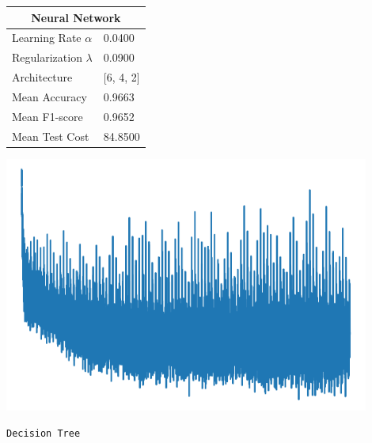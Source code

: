 \documentclass{article}
\begin{document}
\begin{minipage}{0.49\textwidth}
    \centering

    \begin{tabular}{ll}
        \toprule
        \multicolumn{2}{c}{Neural Network} \\
        \midrule
        Learning Rate $\alpha$ & 0.0400 \\
        Regularization $\lambda$ & 0.0900 \\
        Architecture & [6, 4, 2] \\
        Mean Accuracy & 0.9663 \\
        Mean F1-score & 0.9652 \\
        Mean Test Cost & 84.8500 \\
        \bottomrule
    \end{tabular}
    
\end{minipage}
\hfill
\begin{minipage}{0.49\textwidth}
    \centering
    \includegraphics*[width=0.9\textwidth]{./src/figures/Titanic_train_cost.png}
\end{minipage}

\begin{center}
    \texttt{Decision Tree}
\end{center}
\end{document}
